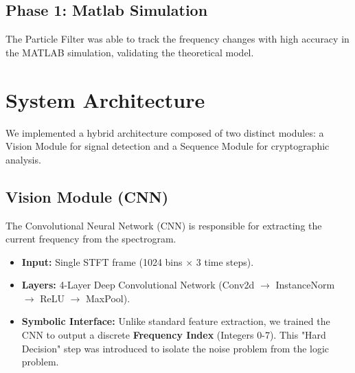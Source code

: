 \documentclass[12pt,a4paper]{report}
\theoremstyle{plain}
\begin{document}
\subsection{Phase 1: Matlab Simulation}
The Particle Filter was able to track the frequency changes with high accuracy in the MATLAB simulation, validating the theoretical model.


\section{System Architecture}
We implemented a hybrid architecture composed of two distinct modules: a Vision Module for signal detection and a Sequence Module for cryptographic analysis.

\subsection{Vision Module (CNN)}
The Convolutional Neural Network (CNN) is responsible for extracting the current frequency from the spectrogram.
\begin{itemize}
    \item \textbf{Input:} Single STFT frame (1024 bins $\times$ 3 time steps).
    \item \textbf{Layers:} 4-Layer Deep Convolutional Network (Conv2d $\to$ InstanceNorm $\to$ ReLU $\to$ MaxPool).
    \item \textbf{Symbolic Interface:} Unlike standard feature extraction, we trained the CNN to output a discrete \textbf{Frequency Index} (Integers 0-7). This "Hard Decision" step was introduced to isolate the noise problem from the logic problem.
\end{itemize}
\end{document}

